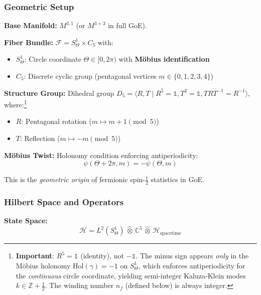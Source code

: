 \documentclass[12pt]{article}
\begin{document}
\subsubsection{Geometric Setup}

\textbf{Base Manifold:} $M^{3,1}$ (or $M^{3+3}$ in full GoE).

\textbf{Fiber Bundle:} $\mathcal{F} = S^1_\Theta \times C_5$ with:
\begin{itemize}
\item $S^1_\Theta$: Circle coordinate $\Theta \in [0, 2\pi)$ with \textbf{M\"obius identification}
\item $C_5$: Discrete cyclic group (pentagonal vertices $m \in \{0,1,2,3,4\}$)
\end{itemize}

\textbf{Structure Group:} Dihedral group $D_5 = \langle R, T \mid R^5 = \mathbb{1}, T^2 = \mathbb{1}, TRT^{-1} = R^{-1} \rangle$, where:\footnote{\textbf{Important}: $R^5 = \mathbb{1}$ (identity), not $-\mathbb{1}$. The minus sign appears \emph{only} in the M\"obius holonomy $\text{Hol}(\gamma) = -1$ on $S^1_\Theta$, which enforces antiperiodicity for the \emph{continuous} circle coordinate, yielding semi-integer Kaluza-Klein modes $k \in \mathbb{Z} + \frac{1}{2}$. The winding number $n_f$ (defined below) is always integer.}
\begin{itemize}
\item $R$: Pentagonal rotation ($m \mapsto m+1 \pmod{5}$)
\item $T$: Reflection ($m \mapsto -m \pmod{5}$)
\end{itemize}

\textbf{M\"obius Twist:} Holonomy condition enforcing antiperiodicity:
\begin{equation}
\boxed{\psi(\Theta + 2\pi, m) = -\psi(\Theta, m)}
\end{equation}

This is the \textit{geometric origin} of fermionic spin-$\frac{1}{2}$ statistics in GoE.

\subsubsection{Hilbert Space and Operators}

\textbf{State Space:}
\begin{equation}
\mathcal{H} = L^2(S^1_\Theta) \,\widehat{\otimes}\, \mathbb{C}^5 \,\widehat{\otimes}\, \mathcal{H}_{\text{spacetime}}
\end{equation}
\end{document}
